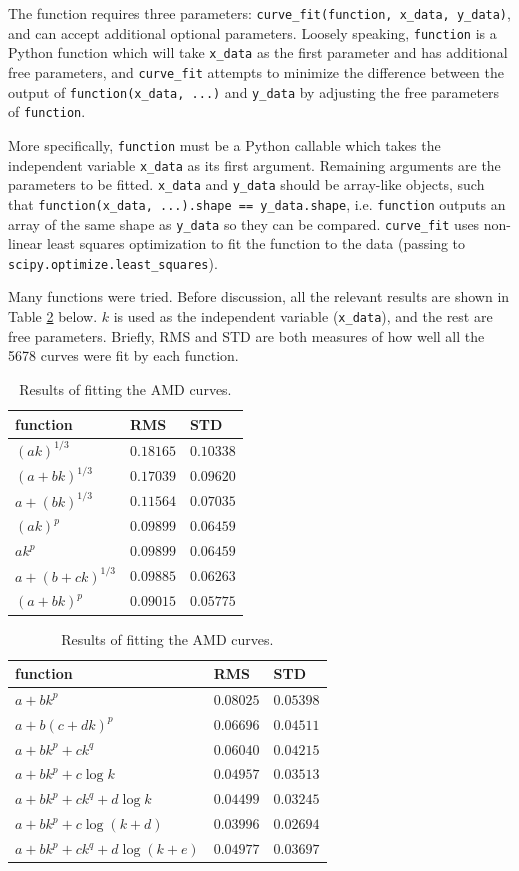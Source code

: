 \documentclass[11pt]{article}
\theoremstyle{definition}
\begin{document}
The function requires three parameters: \texttt{curve\_fit(function, x\_data, y\_data)}, and can accept additional optional parameters. Loosely speaking, \texttt{function} is a Python function which will take \texttt{x\_data} as the first parameter and has additional free parameters, and \texttt{curve\_fit} attempts to minimize the difference between the output of \texttt{function(x\_data, ...)} and \texttt{y\_data} by adjusting the free parameters of \texttt{function}. 

More specifically, \texttt{function} must be a Python callable which takes the independent variable \texttt{x\_data} as its first argument. Remaining arguments are the parameters to be fitted. \texttt{x\_data} and \texttt{y\_data} should be array-like objects, such that \texttt{function(x\_data, ...).shape == y\_data.shape}, i.e. \texttt{function} outputs an array of the same shape as \texttt{y\_data} so they can be compared. \texttt{curve\_fit} uses non-linear least squares optimization to fit the function to the data (passing to \texttt{scipy.optimize.least\_squares}).

\null

Many functions were tried. Before discussion, all the relevant results are shown in Table \ref{fit-table} below. $k$ is used as the independent variable (\texttt{x\_data}), and the rest are free parameters. Briefly, RMS and STD are both measures of how well all the 5678 curves were fit by each function.

\begin{table}[h]
\centering
\begin{tabular}{l|l|l}
function & RMS & STD \\ \hline
$(ak)^{1/3}$         & $0.18165$ & $0.10338$ \\
$(a+bk)^{1/3}$         & $0.17039$ & $0.09620$ \\
$a+(bk)^{1/3}$         & $0.11564$ & $0.07035$ \\
$(ak)^p$         & $0.09899$ &  $0.06459$ \\
$ak^p$         & $0.09899$ & $0.06459$ \\
$a+(b+ck)^{1/3}$         & $0.09885$ & $0.06263$ \\
$(a+bk)^p$         & $0.09015$ & $0.05775$ 
\end{tabular}
\begin{tabular}{l|l|l}
function & RMS & STD \\ \hline
$a+bk^p$         & $0.08025$ & $0.05398$ \\
$a+b(c+dk)^p$         & $0.06696$ & $0.04511$ \\
$a+bk^p+ck^q$         & $0.06040$ & $0.04215$ \\
$a+bk^p+c\log k$         & $0.04957$ & $0.03513$ \\
$a+bk^p+ck^q+d\log k$         & $0.04499$ & $0.03245$ \\
$a+bk^p+c\log (k+d)$         & $0.03996$ & $0.02694$ \\
$a+bk^p+ck^q+d\log (k+e)$         & $0.04977$ & $0.03697$ 
\end{tabular}
\caption{Results of fitting the AMD curves.}
\label{fit-table}
\end{table}
\end{document}

